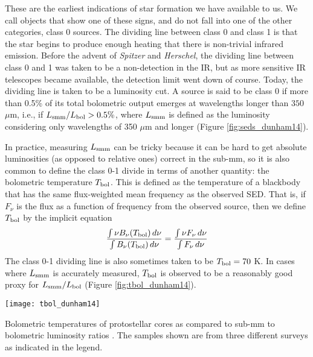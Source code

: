 These are the earliest indications of star formation we have available to us. We call objects that show one of these signs, and do not fall into one of the other categories, class 0 sources. The dividing line between class 0 and class 1 is that the star begins to produce enough heating that there is non-trivial infrared emission. Before the advent of \textit{Spitzer} and \textit{Herschel}, the dividing line between class 0 and 1 was taken to be a non-detection in the IR, but as more sensitive IR telescopes became available, the detection limit went down of course. Today, the dividing line is taken to be a luminosity cut. A source is said to be class 0 if more than 0.5\% of its total bolometric output emerges at wavelengths longer than $350$ $\mu$m, i.e., if $L_{\rm smm} / L_{\rm bol} > 0.5\%$, where $L_{\rm smm}$ is defined as the luminosity considering only wavelengths of 350 $\mu$m and longer (Figure \ref{fig:seds_dunham14}).

In practice, measuring $L_{\rm smm}$ can be tricky because it can be hard to get absolute luminosities (as opposed to relative ones) correct in the sub-mm, so it is also common to define the class 0-1 divide in terms of another quantity: the bolometric temperature $T_{\rm bol}$. This is defined as the temperature of a blackbody that has the same flux-weighted mean frequency as the observed SED. That is, if $F_\nu$ is the flux as a function of frequency from the observed source, then we define $T_{\rm bol}$ by the implicit equation
\begin{equation}
\frac{\int \nu B_{\nu}(T_{\rm bol}) \, d\nu}{\int B_{\nu}(T_{\rm bol}) \, d\nu} = \frac{\int \nu F_{\nu}\, d\nu}{\int F_\nu \,d\nu}
\end{equation}
The class 0-1 dividing line is also sometimes taken to be $T_{\rm bol} = 70$ K. In cases where $L_{\rm smm}$ is accurately measured, $T_{\rm bol}$ is observed to be a reasonably good proxy for $L_{\rm smm} / L_{\rm bol}$ (Figure \ref{fig:tbol_dunham14}).

\begin{marginfigure}
\texttt{[image: tbol\_dunham14]}
\caption[Bolometric temperatures of protostellar cores]{
\label{fig:tbol_dunham14}
Bolometric temperatures of protostellar cores as compared to sub-mm to bolometric luminosity ratios \citep{dunham14a}. The samples shown are from three different surveys as indicated in the legend.
}
\end{marginfigure}

